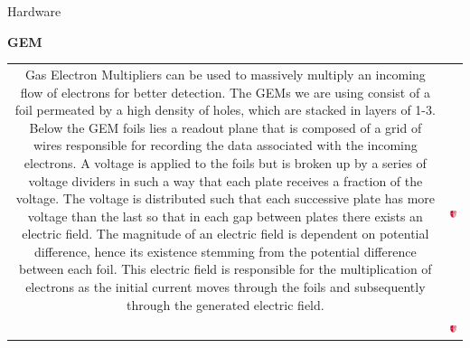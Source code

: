 \documentclass[landscape,a0paper,fontscale=0.285]{baposter} %
\begin{document}
\begin{poster}


\begin{posterbox}[name=hardware,column=0,span=2,row=0,bottomaligned=diagrams]{Hardware}

	\begin{center}
		\textbf{\huge{GEM}}
	\end{center}
		
	\begin{center}
	\begin{tabular}{  c c }
	\multirow{2}{*}{ \parbox{8cm}{
	\indent Gas Electron Multipliers can be used to massively multiply an incoming flow of electrons for better detection. The GEMs we are using consist of a foil permeated by a high density of holes, which are stacked in layers of 1-3. Below the GEM foils lies a readout plane that is composed of a grid of wires responsible for recording the data associated with the incoming electrons. A voltage is applied to the foils but is broken up by a series of voltage dividers in such a way that each plate receives a fraction of the voltage. The voltage is distributed such that each successive plate has more voltage than the last so that in each gap between plates there exists an electric field. The magnitude of an electric field is dependent on potential difference, hence its existence stemming from the potential difference between each foil. This electric field is responsible for the multiplication of electrons as the initial current moves through the foils and subsequently through the generated electric field. 
	}} & \\
	 & \includegraphics[width=3cm]{sheild} \\
	 &  \includegraphics[width=3cm]{sheild} \\
	

\end{tabular}
\end{center}
\end{posterbox}
\end{poster}
\end{document}

